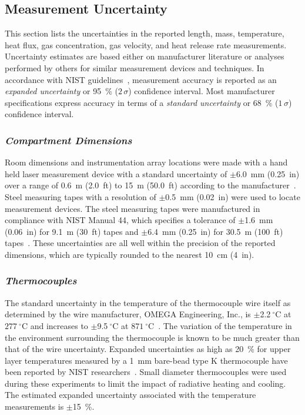 \subsection{Measurement Uncertainty}
This section lists the uncertainties in the reported length, mass, temperature, heat flux, gas concentration, gas velocity, and heat release rate measurements. Uncertainty estimates are based either on manufacturer literature or analyses performed by others for similar measurement devices and techniques. In accordance with NIST guidelines~\cite{Taylor&Kuyatt:1994}, measurement accuracy is reported as an \textit{expanded uncertainty} or 95~\% ($2\,\sigma$) confidence interval. Most manufacturer specifications express accuracy in terms of a \textit{standard  uncertainty} or 68~\% ($1\,\sigma$) confidence interval.

\subsubsection*{\textit{Compartment Dimensions}}
Room dimensions and instrumentation array locations were made with a hand held laser measurement device with a standard uncertainty of $\pm$6.0~mm (0.25~in) over a range of 0.6~m (2.0~ft) to 15~m (50.0~ft) according to the manufacturer~\cite{StanleyTools}. Steel measuring tapes with a resolution of $\pm$0.5~mm (0.02~in) were used to locate measurement devices. The steel measuring tapes were manufactured in compliance with NIST Manual 44, which specifies a tolerance of $\pm$1.6~mm (0.06~in) for 9.1~m (30~ft) tapes and $\pm$6.4~mm (0.25~in) for 30.5~m (100~ft) tapes~\cite{Butcher:2012}. These uncertainties are all well within the precision of the reported dimensions, which are typically rounded to the nearest 10~cm (4~in).

\subsubsection*{\textit{Thermocouples}}
The standard uncertainty in the temperature of the thermocouple wire itself as determined by the wire manufacturer, OMEGA Engineering, Inc., is $\pm$2.2$~^{\circ}$C at $277~^{\circ}$C and increases to $\pm$9.5$~^{\circ}$C at $871~^{\circ}$C~\cite{Omega:2004}. The variation of the temperature in the environment surrounding the thermocouple is known to be much greater than that of the wire uncertainty. Expanded uncertainties as high as 20~\% for upper layer temperatures measured by a 1~mm bare-bead type K thermocouple have been reported by NIST researchers~\cite{Blevins:1999,Pitts:2003}. Small diameter thermocouples were used during these experiments to limit the impact of radiative heating and cooling. The estimated expanded uncertainty associated with the temperature measurements is $\pm$15~\%.

